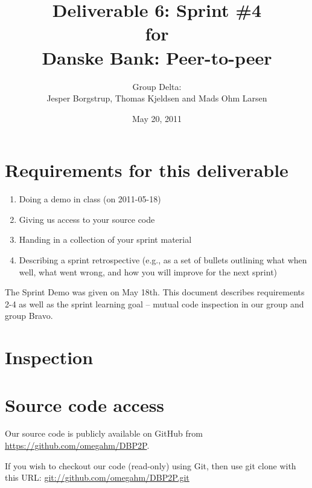 \documentclass[a4paper,11pt]{article}
\title{Deliverable 6: Sprint \#4\\\small{for}\\\small{Danske Bank: Peer-to-peer}}
\author{ Group Delta:\\Jesper Borgstrup, Thomas Kjeldsen and Mads Ohm Larsen }
\date{May 20, 2011}
\begin{document}
\ifpdf
{}
\else
{}
\fi

\maketitle



\section{Requirements for this deliverable}
\begin{enumerate}
\item Doing a demo in class (on 2011-05-18)
\item Giving us access to your source code
\item Handing in a collection of your sprint material
\item Describing a sprint retrospective (e.g., as a set of bullets outlining what
when well, what went wrong, and how you will improve for the next sprint)
\end{enumerate}

The Sprint Demo was given on May 18th. This document describes requirements 2-4 as well as the sprint learning goal -- mutual code inspection in our group and group Bravo.


\section{Inspection}

\section{Source code access}
Our source code is publicly available on GitHub from \url{https://github.com/omegahm/DBP2P}.

If you wish to checkout our code (read-only) using Git, then use git clone with this URL:
\url{git://github.com/omegahm/DBP2P.git}
\end{document}
